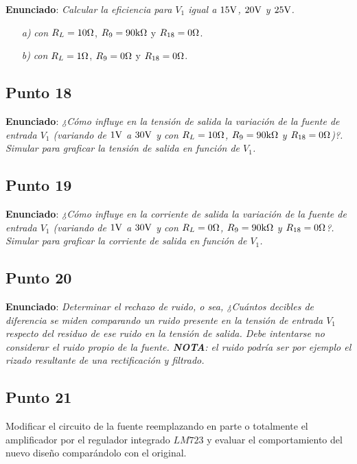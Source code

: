 \textbf{Enunciado}: \textsl{Calcular la eficiencia para $V_{1}$ igual a $15 \si[per-mode=symbol]{\volt}$, $20 \si[per-mode=symbol]{\volt}$ y $25 \si[per-mode=symbol]{\volt}$.}

\begin{enumerate}
\item[\textsl{a)}] \textsl{con} $R_{L} = 10 \si[per-mode=symbol]{\ohm}$, $R_{9} = 90 \si[per-mode=symbol]{\kilo\ohm}$ y $R_{18} = 0 \si[per-mode=symbol]{\ohm}$.
\item[\textsl{b)}] \textsl{con} $R_{L} = 1 \si[per-mode=symbol]{\ohm}$, $R_{9} = 0 \si[per-mode=symbol]{\ohm}$ y $R_{18} = 0 \si[per-mode=symbol]{\ohm}$.
\end{enumerate}




\subsection{Punto 18}

\textbf{Enunciado}: \textsl{¿Cómo influye en la tensión de salida la variación de la fuente de entrada $V_{1}$ (variando de $1 \si[per-mode=symbol]{\volt}$ a $30 \si[per-mode=symbol]{\volt}$ y con $R_{L} = 10 \si[per-mode=symbol]{\ohm}$, $R_{9} = 90 \si[per-mode=symbol]{\kilo\ohm}$ y $R_{18} = 0 \si[per-mode=symbol]{\ohm}$)?. Simular para graficar la tensión de salida en función de $V_{1}$.}\\





\subsection{Punto 19}

\textbf{Enunciado}: \textsl{¿Cómo influye en la corriente de salida la variación de la fuente de entrada $V_{1}$ (variando de $1 \si[per-mode=symbol]{\volt}$ a $30 \si[per-mode=symbol]{\volt}$ y con $R_{L} = 0 \si[per-mode=symbol]{\ohm}$, $R_{9} = 90 \si[per-mode=symbol]{\kilo\ohm}$ y $R_{18} = 0 \si[per-mode=symbol]{\ohm}$?. Simular para graficar la corriente de salida en función de $V_{1}$.}\\




\subsection{Punto 20}

\textbf{Enunciado}: \textsl{Determinar el rechazo de ruido, o sea, ¿Cuántos decibles de diferencia se miden comparando un ruido presente en la tensión de entrada $V_{1}$ respecto del residuo de ese ruido en la tensión de salida. Debe intentarse no considerar el ruido propio de la fuente. \textbf{NOTA}: el ruido podría ser por ejemplo el rizado resultante de una rectificación y filtrado.}\\





\subsection{Punto 21}

Modificar el circuito de la fuente reemplazando en parte o totalmente el amplificador por el regulador integrado $LM723$ y evaluar el comportamiento del nuevo diseño comparándolo con el original.



